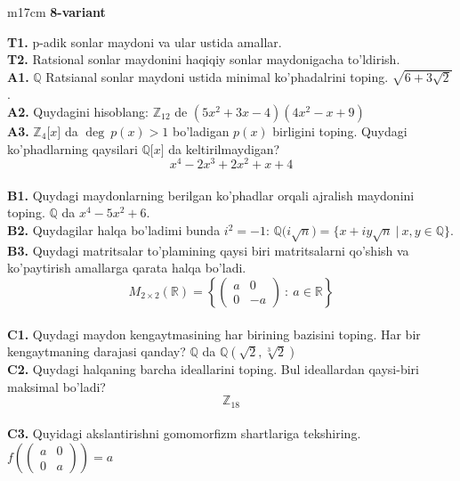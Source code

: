 \documentclass{article}
\begin{document}
\begin{tabular}{m{17cm}}
\textbf{8-variant}
\newline

\textbf{T1.} p-adik sonlar maydoni va ular ustida amallar. \\
\textbf{T2.} Ratsional sonlar maydonini haqiqiy sonlar maydonigacha to'ldirish. \\
\textbf{A1.} \(\mathbb{Q}\) Ratsianal sonlar maydoni ustida minimal ko'phadalrini toping.
\(\sqrt{6 + 3\sqrt{2}}\). \\
\textbf{A2.} Quydagini hisoblang:
\(\mathbb{Z}_{12}\) de \(\left( 5x^{2} + 3x - 4 \right)\left( 4x^{2} - x + 9 \right)\) \\
\textbf{A3.} \(\mathbb{Z}_{4}\lbrack x\rbrack\) da \(\deg\ p(x) > 1\) bo'ladigan \(p(x)\) birligini toping. Quydagi ko'phadlarning qaysilari \(\mathbb{Q\lbrack}x\rbrack\) da keltirilmaydigan?
\[x^{4} - 2x^{3} + 2x^{2} + x + 4\] \\
\textbf{B1.} Quydagi maydonlarning berilgan ko'phadlar orqali ajralish maydonini toping.
\(\mathbb{Q}\) da \(x^{4} - 5x^{2} + 6\). \\
\textbf{B2.} Quydagilar halqa bo'ladimi bunda \(i^{2} = - 1\):
\(\mathbb{Q(}i\sqrt{n}) = \{ x + iy\sqrt{n}\ |\ x,y \in \mathbb{Q\}}\). \\
\textbf{B3.} Quydagi matritsalar to'plamining qaysi biri matritsalarni qo'shish va ko'paytirish amallarga qarata halqa bo'ladi.
\[M_{2 \times 2}\mathbb{(R) =}\left\{ \begin{pmatrix}
a & 0 \\
0 & - a
\end{pmatrix}\ :\ a \in \mathbb{R} \right\}\] \\
\textbf{C1.} Quydagi maydon kengaytmasining har birining bazisini toping. Har bir kengaytmaning darajasi qanday?
\(\mathbb{Q}\) da \(\mathbb{Q}\left( \sqrt{2},\sqrt[3]{2} \right)\) \\
\textbf{C2.} Quydagi halqaning barcha ideallarini toping. Bul ideallardan qaysi-biri maksimal bo'ladi?
\[\mathbb{Z}_{18}\] \\
\textbf{C3.} Quyidagi akslantirishni gomomorfizm shartlariga tekshiring. \(f\left( \begin{pmatrix}
a & 0 \\
0 & a
\end{pmatrix} \right) = a\) \\

\end{tabular}
\vspace{1cm}
\end{document}
